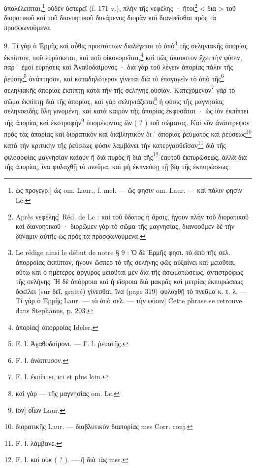\documentclass[a4paper, 11pt, oneside, polutonikogreek, french]{article}
\begin{document}
ὑπολέλειπται,\footnote{ὡς προγεγρ.] ὡς om. Laur., f. mel. --- ὥς φησιν om. Laur. --- καὶ πάλιν φησὶν Lc.} οὐδὲν ὑστερεῖ (f. 171 v.), πλὴν τῆς νεφέλης · ἤτοι\footnote{Après νεφέλης] Réd. de Lc : καὶ τοῦ ὕδατος ἡ ἄρσις, ἤγουν πλὴν τοῦ διορατικοῦ καὶ διανοητικοῦ · διορῶμεν γὰρ τὸ σῶμα τῆς μαγνησίας, διανοοῦμεν δὲ τὴν δύναμιν αὐτῆς ὡς πρὸς τὰ προσφωνούμενα.} < διὰ > τοῦ διορατικοῦ καὶ τοῦ διανοητικοῦ δυνάμενος διορᾶν καὶ διανοεῖσθαι πρὸς τὰ προσφωνούμενα.

9. Τί γὰρ ὁ Ἑρμῆς καὶ αὖθις προστάττων διαλέγεται τὸ ἀπὸ\footnote{Le rédige ainsi le début de notre § 9 : Ὁ δὲ Ἑρμῆς φησι, τὸ ἀπὸ τῆς σελ. ἀπορροίας ἐκπίπτον, ἤγουν ὥσπερ τὸ τῆς σελήνης φῶς αὐξαίνει καὶ μειοῦται, οὕτω καὶ ὁ ἡμέτερος ἄργυρος μειοῦται μὲν διὰ τῆς ἀσωματώσεως, ἀντιστρόφως τῆς σελήνης. Ἡ δὲ ἀπόρροια καὶ ἡ εἴσροια διὰ μακρᾶς καὶ μετρίας ἐκπυρώσεως ὀφείλει (sur δεῖ, gratté) γίνεσθαι, ἵνα (page 319) φυλαχθῇ τὸ πνεῦμα κ. τ. λ. --- Τί γὰρ ὁ Ἑρμῆς Laur. --- τὸ ἀπὸ σελ. --- τὴν φύσιν] Cette phrase se retrouve dans Stephanus, p. 203.} τῆς σεληνιακῆς ἀπορίας ἐκπίπτον, ποῦ εὑρίσκεται, καὶ ποῦ οἰκονομεῖται,\footnote{ἀπορίας] ἀπορροίας Ideler.} καὶ πῶς ἄκαυστον ἔχει τὴν φύσιν, παρ ᾽ ἐμοὶ εὑρήσεις καὶ Ἀγαθοδαίμονος · διὰ γὰρ τοῦ λέγειν ἀπορίας πάλιν τῆς ῥεύσης\footnote{F. l. Ἀγαθοδαίμονι. --- F. l. ῥευστῆς.} ἀνάπτησον, καὶ καταδηλότερον γίνεται διὰ τὸ ἐπαγαγεῖν τὸ ἀπὸ τῆς\footnote{F. l. ἀνάπτυσον.} σεληνιακῆς ἀπορίας ἐκπίπτῃ κατὰ τὴν τῆς σελήνης οὐσίαν. Κατεχόμενον\footnote{F. l. ἐκπίπτει, ici et plus loin.} γὰρ τὸ σῶμα ἐκπίπτῃ διὰ τῆς ἀπορίας, καὶ γὰρ σεληνιάζεται\footnote{καὶ γὰρ --- τῆς μαγνησίας om. Lc.} ἡ φύσις τῆς μαγνησίας σεληνοειδὴς ὅλη γινομένη, καὶ κατὰ καιρὸν τῆς ἀπορίας ἐκφυσᾶται · ὡς ἰὸν ἐκπίπτει τῆς ἀπορίας καὶ ἐκστροφὴν\footnote{ἰὸν] οἶων Laur.} ὑπομένοντος ὢν ( ? ) τοῦ σώματος. Καὶ νῦν ἀνάστρεψον πρὸς τὰς ἀπορίας καὶ διορατικὸν καὶ διαβλητικὸν δι ᾽ ἀπορίας ῥεύματος καὶ ῥεύσεως\footnote{διορατικῆς Laur. --- διαβλυτικὸν διαπορίας mss Corr. conj.} κατὰ τὴν κριτικὴν τῆς ῥεύσεως φύσιν λαμβάνει τὴν κατεργασθεῖσαν\footnote{F. l. λάμβανε.} διὰ τῆς φιλοσοφίας μαγνησίαν καίουν ἢ διὰ πυρὸς ἢ διὰ τῆς\footnote{F. l. καὶ οὐκ ( ? ). --- ἢ διὰ τὰς mss.} ἑαυτοῦ ἐκπυρώσεως, ἀλλὰ διὰ τῆς ἀπορίας, ἵνα φυλαχθῇ τὸ πνεῦμα, καὶ μὴ ἐκπνεύσῃ τῇ βίᾳ τῆς ἐκπυρώσεως.
\end{document}
